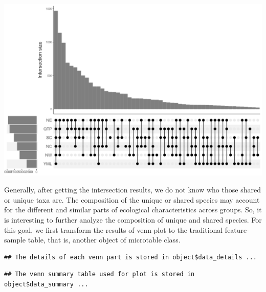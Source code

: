 \documentclass[
]{book}
\newenvironment{Shaded}{\begin{snugshade}}{\end{snugshade}}
\newcommand{\AttributeTok}[1]{\textcolor[rgb]{0.77,0.63,0.00}{#1}}
\newcommand{\FunctionTok}[1]{\textcolor[rgb]{0.00,0.00,0.00}{#1}}
\newcommand{\NormalTok}[1]{#1}
\newcommand{\OtherTok}[1]{\textcolor[rgb]{0.56,0.35,0.01}{#1}}
\newcommand{\SpecialCharTok}[1]{\textcolor[rgb]{0.00,0.00,0.00}{#1}}
\newcommand{\StringTok}[1]{\textcolor[rgb]{0.31,0.60,0.02}{#1}}
\begin{document}
\begin{center}\includegraphics[width=800px]{Images/plot_venn_bar_type} \end{center}

Generally, after getting the intersection results, we do not know who those shared or unique taxa are.
The composition of the unique or shared species may account for the different and similar parts of ecological characteristics across groups\citep{Mendes_Deciphering_2011}.
So, it is interesting to further analyze the composition of unique and shared species.
For this goal, we first transform the results of venn plot to the traditional feature-sample table, that is, another object of microtable class.

\begin{Shaded}
\end{Shaded}

\begin{verbatim}
## The details of each venn part is stored in object$data_details ...
\end{verbatim}

\begin{verbatim}
## The venn summary table used for plot is stored in object$data_summary ...
\end{verbatim}
\end{document}
